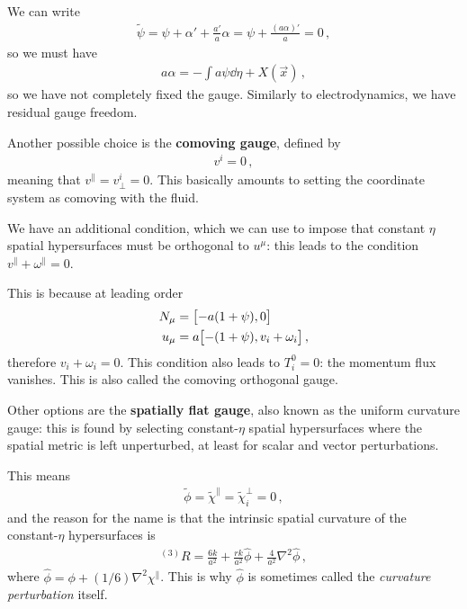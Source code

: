 \documentclass[main.tex]{subfiles}
\begin{document}
We can write 
%
\begin{align}
\widetilde{\psi} = \psi + \alpha ' + \frac{a'}{a} \alpha = \psi + \frac{(a \alpha )'}{a} = 0
\,,
\end{align}
%
so we must have 
%
\begin{align}
a \alpha = -\int a \psi \dd{\eta } + X(\vec{x})
\,,
\end{align}
%
so we have not completely fixed the gauge. 
Similarly to electrodynamics, we have residual gauge freedom. 

Another possible choice is the \textbf{comoving gauge}, 
defined by 
%
\begin{align}
v^{i} = 0
\,,
\end{align}
%
meaning that \(v^{\parallel} = v^{i}_\perp = 0\). This basically amounts to setting the coordinate system as comoving with the fluid.

We have an additional condition, which we can use to impose that constant \(\eta \) spatial hypersurfaces must be orthogonal to \(u^{\mu }\): this leads to the condition \(v^{\parallel} + \omega^{\parallel} = 0\). 

This is because at leading order 
%
\begin{align}
N_{\mu } &= \qty[- a (1 + \psi ), 0]  \\
u_{\mu } &= a\qty[ - (1 + \psi ), v_i + \omega _i]
\,,
\end{align}
%
therefore \(v_i + \omega _i = 0\). 
This condition also leads to \(T^{0}_{i} = 0\): the momentum flux vanishes. 
This is also called the comoving orthogonal gauge. 


Other options are the \textbf{spatially flat gauge}, also known as the uniform curvature gauge: this is found by selecting constant-\(\eta \) spatial hypersurfaces where the spatial metric is left unperturbed, at least for scalar and vector perturbations. 

This means 
%
\begin{align}
\widetilde{\phi} = \widetilde{\chi}^{\parallel} = \widetilde{\chi}^{\perp}_i = 0
\,,
\end{align}
%
and the reason for the name is that the intrinsic spatial curvature of the constant-\(\eta \) hypersurfaces is 
%
\begin{align}
^{(3)}R = \frac{6k}{a^2} + \frac{rk}{a^2} \hat{\phi} + \frac{4}{a^2} \nabla^2 \hat{\phi}
\,,
\end{align}
%
where \(\hat{\phi} = \phi + (1/6) \nabla^2 \chi^{\parallel}\). 
This is why \(\hat{\phi}\) is sometimes called the \emph{curvature perturbation} itself.
\end{document}

